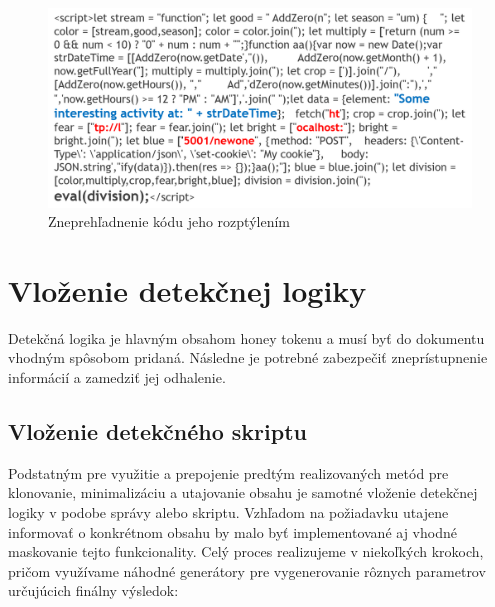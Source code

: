 \documentclass[conference, 11pt,slovak,a4paper,twoside]{IEEEtran}
\begin{document}
\begin{figure}[!t]  %
					\begin{center}
									\includegraphics[width=\linewidth]{fig/codeScattering.png}
									\caption{Zneprehľadnenie kódu jeho rozptýlením}
									\label{codeScattering}
					\end{center}
\end{figure}



\section{Vloženie detekčnej logiky} \label{detectionLogicInsertion}

Detekčná logika je hlavným obsahom honey tokenu a musí byť do dokumentu vhodným spôsobom pridaná. Následne je potrebné zabezpečiť zneprístupnenie informácií a zamedziť jej odhalenie.


\subsection{Vloženie detekčného skriptu} \label{detectionScriptInsertion}

Podstatným pre využitie a prepojenie predtým realizovaných metód pre klonovanie, minimalizáciu a utajovanie obsahu je samotné vloženie detekčnej logiky v podobe správy alebo skriptu. Vzhľadom na požiadavku utajene informovať o konkrétnom obsahu by malo byť implementované aj vhodné maskovanie tejto funkcionality. Celý proces realizujeme v niekoľkých krokoch, pričom využívame náhodné generátory pre vygenerovanie rôznych parametrov určujúcich finálny výsledok:
\end{document}

